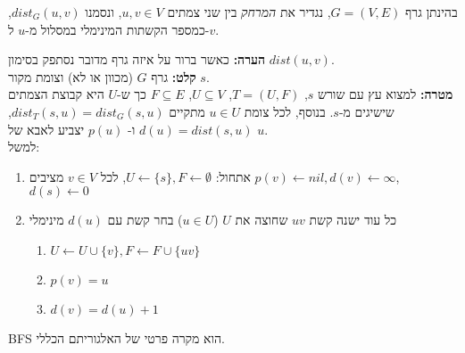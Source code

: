 \begin{definition}[מרחק]
בהינתן גרף 
$G = (V, E)$,
נגדיר את 
\emph{המרחק}
בין שני צמתים 
$u,v \in V$,
ונסמנו 
$dist_G(u,v)$,
כמספר הקשתות המינימלי במסלול מ-$u$ ל-$v$.
\end{definition}
\noindent
\textbf{הערה:}
כאשר ברור על איזה גרף מדובר נסתפק בסימון 
$dist(u,v)$.
\vspace{5mm}
\\
\textbf{קלט:}
גרף $G$ (מכוון או לא) וצומת מקור $s$.
\\
\textbf{מטרה:}
למצוא עץ עם שורש $s$,
$T = (U, F)$, 
$U \subseteq V$, 
$F \subseteq E$
כך ש-$U$ היא קבוצת הצמתים שישיגים מ-$s$.
בנוסף, לכל צומת 
$u \in U$
מתקיים
$dist_T(s, u) = dist_G(s, u)$,
$d(u) = dist(s,u)$
ו-%
$p(u)$
יצביע לאבא של 
$u$.
\\
למשל:
\begin{center}
\end{center}

\begin{enumerate}
\item
אתחול:
$U \leftarrow \{s\}, F \leftarrow \emptyset$, 
לכל 
$v \in V$
מציבים
$p(v) \leftarrow nil, d(v) \leftarrow \infty$,
$d(s) \leftarrow 0$
\item 
\label{item:bfs:while}
כל עוד ישנה קשת 
$uv$
שחוצה את $U$ 
($u \in U$)
בחר קשת עם 
$d(u)$
מינימלי
	\begin{enumerate}
	\item
	$U \leftarrow U \cup \{v\}, F \leftarrow F \cup \{uv\}$
	\item
	$p(v) = u$
	\item
	$d(v) = d(u) + 1$
	\end{enumerate}
\end{enumerate}
BFS
הוא מקרה פרטי של האלגוריתם הכללי.


